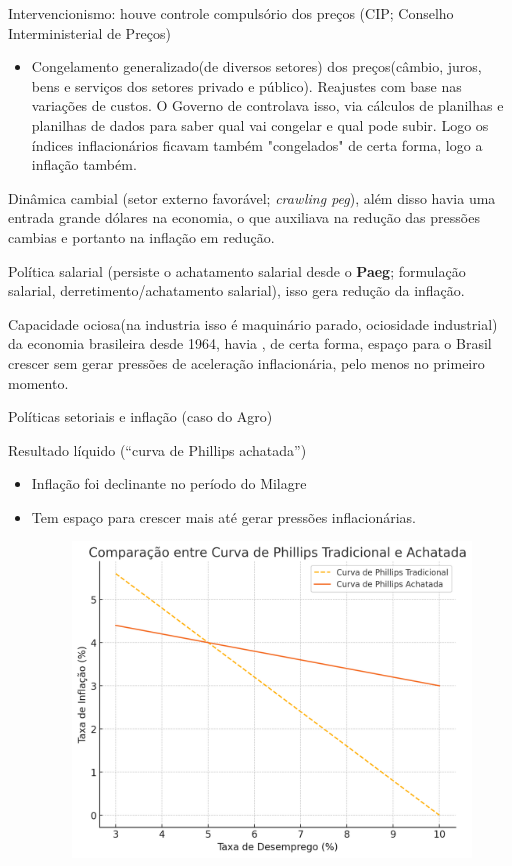 \documentclass[a4paper,12pt]{article}[abntex2]
\begin{document}
Intervencionismo: houve controle compulsório dos preços (CIP; Conselho Interministerial de Preços)\begin{itemize}
    \item Congelamento generalizado(de diversos setores) dos preços(câmbio, juros, bens e serviços dos setores privado e público). Reajustes com base nas variações de custos. O Governo de controlava isso, via cálculos de planilhas e planilhas de dados para saber qual vai congelar e qual pode subir. Logo os índices inflacionários ficavam também "congelados" de certa forma, logo a inflação também.
\end{itemize}   

Dinâmica cambial (setor externo favorável; \textit{crawling peg}), além disso havia uma entrada grande dólares na economia, o que auxiliava na redução das pressões cambias e portanto na inflação em redução.

Política salarial (persiste o achatamento salarial desde o \textbf{Paeg}; formulação salarial, derretimento/achatamento salarial), isso gera redução da inflação.

Capacidade ociosa(na industria isso é maquinário parado, ociosidade industrial) da economia brasileira desde 1964, havia , de certa forma, espaço para o Brasil crescer sem gerar pressões de aceleração inflacionária, pelo menos no primeiro momento.

Políticas setoriais e inflação (caso do Agro)

Resultado líquido (“curva de Phillips achatada”)\begin{itemize}
    \item Inflação foi declinante no período do Milagre
    \item Tem espaço para crescer mais até gerar pressões inflacionárias.
    \begin{figure}[H]
        \centering
        \includegraphics[width=0.7\linewidth]{Imagens/a4i3.png}
    \end{figure}
\end{itemize}
\end{document}
